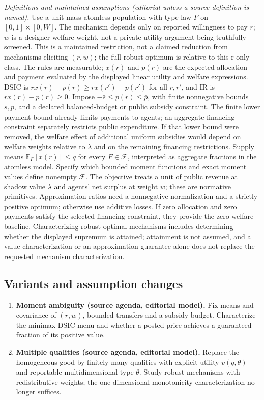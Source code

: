 \documentclass[11pt,a4paper]{article}
\begin{document}
\emph{Definitions and maintained assumptions (editorial unless a source definition is named).} Use a unit-mass atomless population with type law \(F\) on \([0,1]\times[0,W]\). The mechanism depends only on reported willingness to pay \(r\); \(w\) is a designer welfare weight, not a private utility argument being truthfully screened. This is a maintained restriction, not a claimed reduction from mechanisms eliciting \((r,w)\); the full robust optimum is relative to this r-only class. The rules are measurable; \(x(r)\) and \(p(r)\) are the expected allocation and payment evaluated by the displayed linear utility and welfare expressions. DSIC is \(rx(r)-p(r)\ge rx(r')-p(r')\) for all \(r,r'\), and IR is \(rx(r)-p(r)\ge0\). Impose \(-\bar s\le p(r)\le\bar p\), with finite nonnegative bounds \(\bar s,\bar p\), and a declared balanced-budget or public subsidy constraint. The finite lower payment bound already limits payments to agents; an aggregate financing constraint separately restricts public expenditure. If that lower bound were removed, the welfare effect of additional uniform subsidies would depend on welfare weights relative to \(\lambda\) and on the remaining financing restrictions. Supply means \(\mathbb E_F[x(r)]\le q\) for every \(F\in\mathcal F\), interpreted as aggregate fractions in the atomless model. Specify which bounded moment functions and exact moment values define nonempty \(\mathcal F\). The objective treats a unit of public revenue at shadow value \(\lambda\) and agents’ net surplus at weight \(w\); these are normative primitives. Approximation ratios need a nonnegative normalization and a strictly positive optimum; otherwise use additive losses. If zero allocation and zero payments satisfy the selected financing constraint, they provide the zero-welfare baseline. Characterizing robust optimal mechanisms includes determining whether the displayed supremum is attained; attainment is not assumed, and a value characterization or an approximation guarantee alone does not replace the requested mechanism characterization.
\subsection*{Variants and assumption changes}
\begin{enumerate}
\item \textbf{Moment ambiguity (source agenda, editorial model).} Fix means and covariance of \((r,w)\), bounded transfers and a subsidy budget. Characterize the minimax DSIC menu and whether a posted price achieves a guaranteed fraction of its positive value.
\item \textbf{Multiple qualities (source agenda, editorial model).} Replace the homogeneous good by finitely many qualities with explicit utility \(v(q,\theta)\) and reportable multidimensional type \(\theta\). Study robust mechanisms with redistributive weights; the one-dimensional monotonicity characterization no longer suffices.
\end{enumerate}
\end{document}
